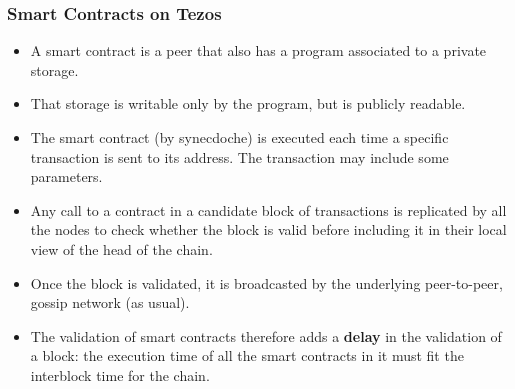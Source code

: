 \documentclass[compress,dvips,xcolor={dvipsnames},t]{beamer}
\begin{document}
\begin{frame}
  \frametitle{Smart Contracts on Tezos}

  \begin{itemize}

    \item A smart contract is a peer that also has a program
      associated to a private storage.

    \item That storage is writable only by the program, but is
      publicly readable.

    \item The smart contract (by synecdoche) is executed each time a
      specific transaction is sent to its address. The transaction may
      include some parameters.

    \item Any call to a contract in a candidate block of transactions
      is replicated by all the nodes to check whether the block is
      valid before including it in their local view of the head of the
      chain.

    \item Once the block is validated, it is broadcasted by the
      underlying peer-to-peer, gossip network (as usual).

    \item The validation of smart contracts therefore adds a
      \textbf{delay} in the validation of a block: the execution time of
      all the smart contracts in it must fit the interblock time for
      the chain.

  \end{itemize}

\end{frame}

\end{document}
